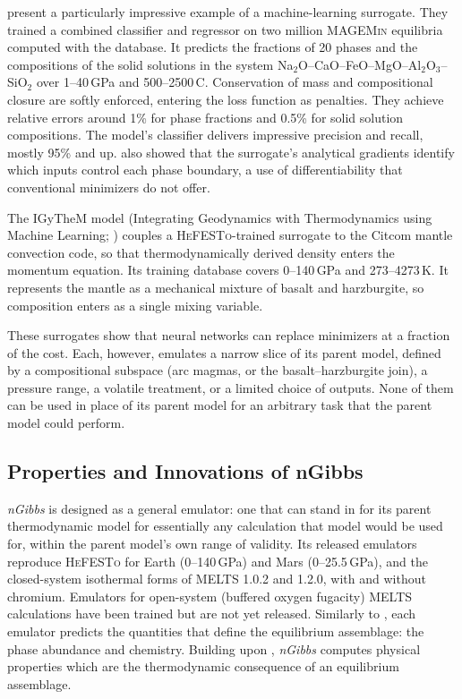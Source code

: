 \citet{hartmeier2026} present a particularly impressive example of a machine-learning surrogate. They trained a combined classifier 
and regressor on two million \textsc{MAGEMin} equilibria computed with the \citet{stixrude2022} database. It predicts the fractions of 
20 phases and the compositions of the solid solutions in the system Na$_2$O--CaO--FeO--MgO--Al$_2$O$_3$--SiO$_2$ over 1--40\,GPa and 500--2500\,\textdegree C. 
Conservation of mass and compositional closure are softly enforced, entering the loss function as penalties. They achieve relative errors around 1\% 
for phase fractions and 0.5\% for solid solution compositions. The model's classifier delivers impressive precision and recall, mostly 95\%
and up.  \citet{hartmeier2026} also showed that the surrogate's analytical gradients
identify which inputs control each phase boundary, a use of differentiability that conventional minimizers do not offer.

The IGyTheM model (Integrating Geodynamics with Thermodynamics using Machine Learning; \citealp{yuan2025igythem}) couples a
\textsc{HeFESTo}-trained surrogate to the Citcom mantle convection code, so that thermodynamically derived density enters the
momentum equation. Its training database covers 0--140\,GPa and 273--4273\,K. It represents the mantle as a mechanical mixture
of basalt and harzburgite, so composition enters as a single mixing variable.

These surrogates show that neural networks can replace minimizers at a fraction of the cost. Each, however, emulates a narrow
slice of its parent model, defined by a compositional subspace (arc magmas, or the basalt--harzburgite join), a pressure range, a
volatile treatment, or a limited choice of outputs. None of them can be used in place of its parent model for an arbitrary task that the
parent model could perform.

\subsection{Properties and Innovations of nGibbs}\label{ch4-innovations}

\emph{nGibbs} is designed as a general emulator: one that can stand in for its parent thermodynamic model for essentially any
calculation that model would be used for, within the parent model's own range of validity. Its released emulators reproduce
\textsc{HeFESTo} for Earth (0--140\,GPa) and Mars (0--25.5\,GPa), and the closed-system isothermal forms of \textsc{MELTS} 1.0.2 and 1.2.0, with
and without chromium. Emulators for open-system (buffered oxygen fugacity) \textsc{MELTS} calculations have been
trained but are not yet released. Similarly to \citet{hartmeier2026}, each emulator predicts the quantities that define the equilibrium assemblage: the 
phase abundance and chemistry. Building upon \citet{yuan2026}, \emph{nGibbs} computes physical properties which are the thermodynamic consequence of an equilibrium assemblage. 

